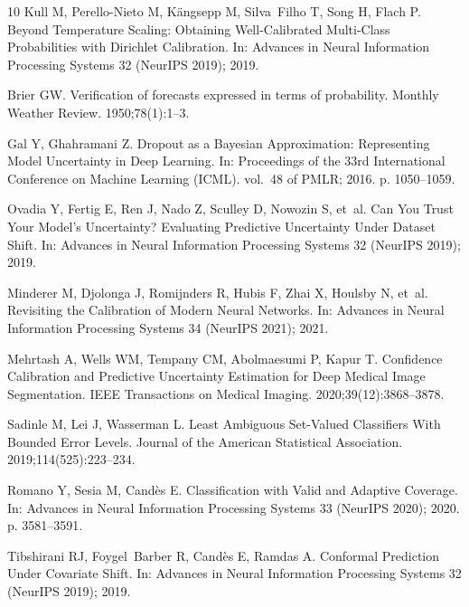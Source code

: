\documentclass[VANCOUVER,Times1COL]{WileyNJDv5}
\begin{document}
\begin{thebibliography}{10}
Kull M, Perello-Nieto M, K{\"a}ngsepp M, Silva~Filho T, Song H, Flach P.
\newblock Beyond Temperature Scaling: Obtaining Well-Calibrated Multi-Class
  Probabilities with {D}irichlet Calibration.
\newblock In: Advances in Neural Information Processing Systems 32 (NeurIPS
  2019); 2019.

Brier GW.
\newblock Verification of forecasts expressed in terms of probability.
\newblock Monthly Weather Review. 1950;78(1):1--3.

Gal Y, Ghahramani Z.
\newblock Dropout as a {B}ayesian Approximation: Representing Model Uncertainty
  in Deep Learning.
\newblock In: Proceedings of the 33rd International Conference on Machine
  Learning (ICML). vol.~48 of PMLR; 2016. p. 1050--1059.

Ovadia Y, Fertig E, Ren J, Nado Z, Sculley D, Nowozin S, et~al.
\newblock Can You Trust Your Model's Uncertainty? {E}valuating Predictive
  Uncertainty Under Dataset Shift.
\newblock In: Advances in Neural Information Processing Systems 32 (NeurIPS
  2019); 2019.

Minderer M, Djolonga J, Romijnders R, Hubis F, Zhai X, Houlsby N, et~al.
\newblock Revisiting the Calibration of Modern Neural Networks.
\newblock In: Advances in Neural Information Processing Systems 34 (NeurIPS
  2021); 2021.

Mehrtash A, Wells WM, Tempany CM, Abolmaesumi P, Kapur T.
\newblock Confidence Calibration and Predictive Uncertainty Estimation for Deep
  Medical Image Segmentation.
\newblock IEEE Transactions on Medical Imaging. 2020;39(12):3868--3878.

Sadinle M, Lei J, Wasserman L.
\newblock Least Ambiguous Set-Valued Classifiers With Bounded Error Levels.
\newblock Journal of the American Statistical Association.
  2019;114(525):223--234.

Romano Y, Sesia M, Cand{\`e}s E.
\newblock Classification with Valid and Adaptive Coverage.
\newblock In: Advances in Neural Information Processing Systems 33 (NeurIPS
  2020); 2020. p. 3581--3591.

Tibshirani RJ, Foygel~Barber R, Cand{\`e}s E, Ramdas A.
\newblock Conformal Prediction Under Covariate Shift.
\newblock In: Advances in Neural Information Processing Systems 32 (NeurIPS
  2019); 2019.


\end{thebibliography}
\end{document}
